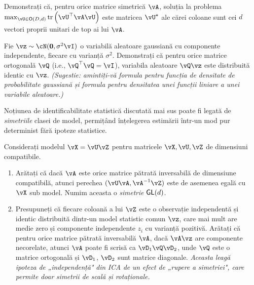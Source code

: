 \documentclass[../../book-main_ro.tex]{subfiles}
\begin{document}
\begin{exercise}\label{exercise:principal-components-derivation}
    Demonstrați că, pentru orice matrice simetrică \(\vA\), soluția la problema
    \(\max_{\vU \in \O(D, d)}\tr\left(\vU^{\top}\vA\vU\right)\) este matricea
    \(\vU^{\star}\) ale cărei coloane sunt cei \(d\) vectori proprii unitari de top ai lui \(\vA\).
\end{exercise}

\begin{exercise}\label{exercise:gaussian-rot-invar}
    Fie $\vz \sim \cN(\Zero, \sigma^2 \vI)$ o variabilă aleatoare gaussiană cu componente independente, fiecare cu varianță $\sigma^2$.
    Demonstrați că pentru orice matrice ortogonală $\vQ$ (i.e., $\vQ^\top \vQ = \vI$), variabila aleatoare $\vQ \vz$ este distribuită identic cu $\vz$.
    \textit{(Sugestie: amintiți-vă formula pentru funcția de densitate de probabilitate gaussiană și formula pentru densitatea unei funcții liniare a unei variabile aleatoare.)}
\end{exercise}

\begin{exercise}\label{exercise:symmetry-identifiability}
    Noțiunea de identificabilitate statistică discutată mai sus poate fi legată de \textit{simetriile} clasei de model, permițând înțelegerea estimării într-un mod pur determinist fără ipoteze statistice.

    Considerați modelul $\vX = \vU \vZ$ pentru matricele $\vX, \vU, \vZ$ de dimensiuni compatibile.
    \begin{enumerate}
        \item Arătați că dacă $\vA$ este orice matrice pătrată inversabilă de dimensiune compatibilă, atunci perechea
        $(\vU \vA, \vA^{-1} \vZ)$ este de asemenea egală cu $\vX$ sub model. Numim aceasta o \textit{simetrie $\mathsf{GL}(d)$}.
        \item Presupuneți că fiecare coloană a lui $\vZ$ este o observație independentă și identic distribuită dintr-un model statistic comun $\vz$, care mai mult are medie zero și componente independente $z_i$ cu varianță pozitivă.
        Arătați că pentru orice matrice pătrată inversabilă $\vA$, dacă $\vA \vz$ are componente necorelate, atunci $\vA$ poate fi scrisă ca $\vD_1 \vQ \vD_2$, unde $\vQ$ este o matrice ortogonală și $\vD_1$, $\vD_2$ sunt matrice diagonale.
        \textit{Aceasta leagă ipoteza de „independență" din ICA de un efect de „rupere a simetriei", care permite doar simetrii de scală și rotaționale.}
    \end{enumerate}
\end{exercise}
\end{document}
